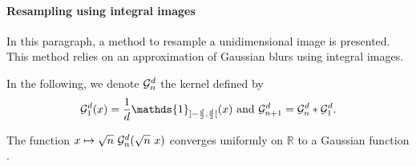 



\paragraph{Resampling using integral images}
\label{4Integral}

In this paragraph, a method to resample a unidimensional image is presented. This method relies on an approximation of Gaussian blurs using integral images.%


In the following, we denote $\mathcal{G}_n^d$ the kernel defined by
\begin{equation}
\Gcal_1^d(x)=\frac{1}{d}\mathds{1}_{]-\frac{d}{2},\frac{d}{2}[}(x) \text{ and } \Gcal_{n+1}^d= \Gcal_n^d * \Gcal_1^d .
\label{formule_convol_n_int}
\end{equation}

\begin{prop}
The function $x\mapsto \sqrt{n}~\mathcal{G}_n^d(\sqrt{n}~x)$ converges uniformly on $\mathbb{R}$ to a Gaussian function .
\end{prop}

